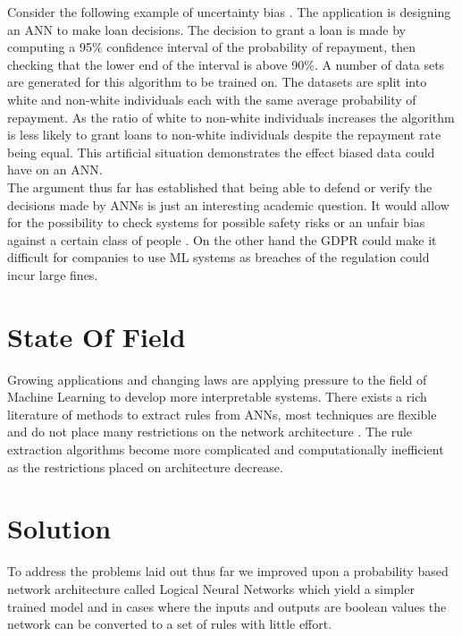 Consider the following example of uncertainty bias \cite{goodman2016european}. The application is designing an ANN to make loan decisions. The decision to grant a loan is made by computing a 95\% confidence interval of the probability of repayment, then checking that the lower end of the interval is above 90\%. A number of data sets are generated for this algorithm to be trained on. The datasets are split into white and non-white individuals each with the same average probability of repayment. As the ratio of white to non-white individuals increases the algorithm is less likely to grant loans to non-white individuals despite the repayment rate being equal. This artificial situation demonstrates the effect biased data could have on an ANN.\\

The argument thus far has established that being able to defend or verify the decisions made by ANNs is just an interesting academic question. It would allow for the possibility to check systems for possible safety risks or an unfair bias against a certain class of people \cite{goodman2016european}. On the other hand the GDPR could make it difficult for companies to use ML systems as breaches of the regulation could incur large fines.

\section{State Of Field}
Growing applications and changing laws are applying pressure to the field of Machine Learning to develop more interpretable systems. There exists a rich literature of methods to extract rules from ANNs, most techniques are flexible and do not place many restrictions on the network architecture \cite{andrews1995survey} \cite{duch2004computational} \cite{tsukimoto2000extracting}. The rule extraction algorithms become more complicated and computationally inefficient as the restrictions placed on architecture decrease.\\

\section{Solution}
To address the problems laid out thus far we improved upon a probability based network architecture called Logical Neural Networks which yield a simpler trained model \cite{LearningLogicalActivations} and in cases where the inputs and outputs are boolean values the network can be converted to a set of rules with little effort.\\

